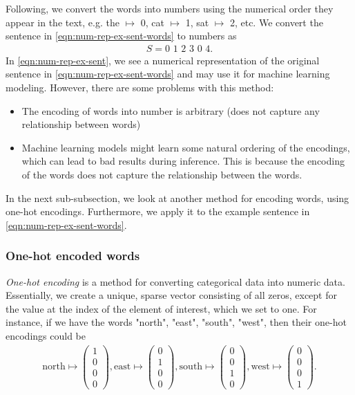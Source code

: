 Following, we convert the words into numbers using the numerical order they appear in the text, e.g. the $\mapsto$ 0, cat $\mapsto$ 1, sat $\mapsto$ 2, etc. We convert the sentence in \cref{eqn:num-rep-ex-sent-words} to numbers as
\begin{align}
    S = \text{0 1 2 3 0 4}
    \label{eqn:num-rep-ex-sent}.
\end{align}
In \cref{eqn:num-rep-ex-sent}, we see a numerical representation of the original sentence in \cref{eqn:num-rep-ex-sent-words} and may use it for machine learning modeling. However, there are some problems with this method:
\begin{itemize}
    \item The encoding of words into number is arbitrary (does not capture any relationship between words)
    \item Machine learning models might learn some natural ordering of the encodings, which can lead to bad results during inference. This is because the encoding of the words does not capture the relationship between the words.
\end{itemize}

In the next sub-subsection, we look at another method for encoding words, using one-hot encodings. Furthermore, we apply it to the example sentence in \cref{eqn:num-rep-ex-sent-words}.

\subsubsection{One-hot encoded words}
\textit{One-hot encoding} is a method for converting categorical data into numeric data. Essentially, we create a unique, sparse vector consisting of all zeros, except for the value at the index of the element of interest, which we set to one. For instance, if we have the words "north", "east", "south", "west", then their one-hot encodings could be
\begin{align}
    \text{north} \mapsto \begin{pmatrix}
    1\\
    0\\
    0\\
    0
    \end{pmatrix},
    \text{east} \mapsto \begin{pmatrix}
    0\\
    1\\
    0\\
    0
    \end{pmatrix},
    \text{south} \mapsto \begin{pmatrix}
    0\\
    0\\
    1\\
    0
    \end{pmatrix},
    \text{west} \mapsto \begin{pmatrix}
    0\\
    0\\
    0\\
    1
    \end{pmatrix}.
\end{align}

